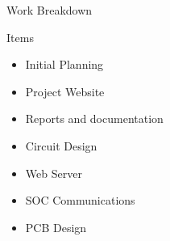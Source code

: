 %
%

\begin{frame}{Work Breakdown}
\begin{block}{Items}
  \begin{itemize}
    \item Initial Planning
    \item Project Website
    \item Reports and documentation
    \item Circuit Design
    \item Web Server
    \item SOC Communications
    \item PCB Design
  \end{itemize}
\end{block}
\end{frame}

